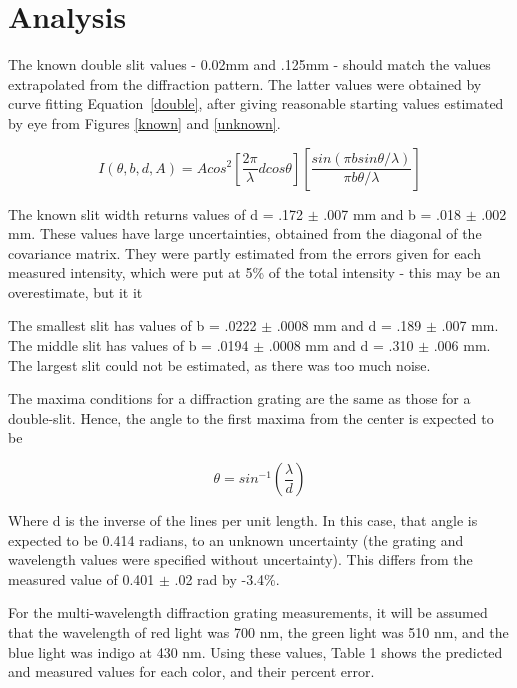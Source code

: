\documentclass[journal]{IEEEtran}
\begin{document}
\section{Analysis}

The known double slit values - 0.02mm and .125mm - should match the values
extrapolated from the diffraction pattern. The latter values were obtained by
curve fitting Equation~\ref{double}, after giving reasonable starting values
estimated by eye from Figures \ref{known} and \ref{unknown}.

\begin{equation}
\label{double}
I(\theta, b, d, A) = A cos^2 \left[ \frac{2 \pi}{\lambda} d cos \theta
\right] \left[ \frac{sin (\pi b sin \theta / \lambda)}{\pi b \theta / \lambda}
\right]
\end{equation}


The known slit width returns values of d = .172 $\pm$ .007 mm and b = .018
$\pm$ .002 mm. These values have large uncertainties, obtained from the
diagonal of the covariance matrix. They were partly estimated from the errors given for each measured intensity, which were put at 5\% of the total intensity - this may be an overestimate, but it it 

The smallest slit has values of b = .0222 $\pm$ .0008 mm and d = .189 $\pm$
.007 mm. The middle slit has values of b = .0194 $\pm$ .0008 mm and d = .310
$\pm$ .006 mm. The largest slit could not be estimated, as there was too much noise.

The maxima conditions for a diffraction grating are the same as those for a
double-slit. Hence, the angle to the first maxima from the center is expected
to be

\begin{displaymath}
\theta = sin^{-1} \left( \frac{\lambda}{d} \right)
\end{displaymath}

Where d is the inverse of the lines per unit length. In this case, that angle
is expected to be 0.414 radians, to an unknown uncertainty (the grating and
wavelength values were specified without uncertainty). This differs from the
measured value of 0.401 $\pm$ .02 rad by -3.4\%.

For the multi-wavelength diffraction grating measurements, it will be assumed
that the wavelength of red light was 700 nm, the green light was 510 nm, and
the blue light was indigo at 430 nm. Using these values, Table 1 shows the
predicted and measured values for each color, and their percent error.
\end{document}

